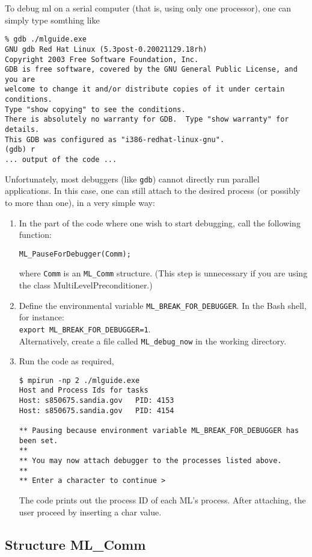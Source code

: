 \documentclass[10pt,letter,relax]{SANDreport}
\newcommand{\ML}     {{\sc ml }}
\begin{document}
To debug \ML on a serial computer (that is, using only one processor),
one can simply type somthing like
\begin{verbatim}
% gdb ./mlguide.exe
GNU gdb Red Hat Linux (5.3post-0.20021129.18rh)
Copyright 2003 Free Software Foundation, Inc.
GDB is free software, covered by the GNU General Public License, and you are
welcome to change it and/or distribute copies of it under certain conditions.
Type "show copying" to see the conditions.
There is absolutely no warranty for GDB.  Type "show warranty" for details.
This GDB was configured as "i386-redhat-linux-gnu".
(gdb) r
... output of the code ...
\end{verbatim}
Unfortunately, most debuggers (like \verb!gdb!) cannot directly run
parallel applications. In this case, one can still attach to the desired
process (or possibly to more than one), in a very simple way:
\begin{enumerate}
\item In the part of the code where one wish to start debugging, call
  the following function:
\begin{verbatim}
ML_PauseForDebugger(Comm);
\end{verbatim}
where \verb!Comm! is an \verb!ML_Comm! structure.
(This step is unnecessary if you are using the class MultiLevelPreconditioner.)
\item Define the environmental variable \verb!ML_BREAK_FOR_DEBUGGER!.
  In the Bash shell, for instance:\\
{\tt export ML\_BREAK\_FOR\_DEBUGGER=1}.\\
Alternatively, create a file
called \verb!ML_debug_now! in the working directory.
\item Run the code as required,
\begin{verbatim}
$ mpirun -np 2 ./mlguide.exe
Host and Process Ids for tasks
Host: s850675.sandia.gov   PID: 4153
Host: s850675.sandia.gov   PID: 4154

** Pausing because environment variable ML_BREAK_FOR_DEBUGGER has been set.
**
** You may now attach debugger to the processes listed above.
**
** Enter a character to continue >
\end{verbatim}
The code prints out the process ID of each ML's process. After
attaching, the user proceed by inserting a char value.
\end{enumerate}


\subsection{Structure ML\_Comm}
\end{document}
